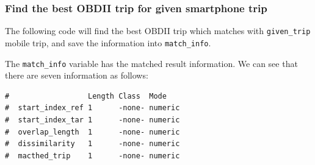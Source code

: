 \documentclass[letterpaper,9pt,twocolumn,twoside,]{pinp}
\begin{document}
\hypertarget{find-the-best-obdii-trip-for-given-smartphone-trip}{%
\subsubsection{Find the best OBDII trip for given smartphone
trip}\label{find-the-best-obdii-trip-for-given-smartphone-trip}}

The following code will find the best OBDII trip which matches with
\texttt{given\_trip} mobile trip, and save the information into
\texttt{match\_info}.

\begin{Shaded}
\begin{Highlighting}[]
\StringTok{ }\NormalTok{mobile_data[[}\NormalTok{]]}

\StringTok{ }
\end{Highlighting}
\end{Shaded}

The \texttt{match\_info} variable has the matched result information. We
can see that there are seven information as follows:

\begin{Shaded}
\begin{Highlighting}[]
\end{Highlighting}
\end{Shaded}

\begin{ShadedResult}
\begin{verbatim}
#                  Length Class  Mode   
#  start_index_ref 1      -none- numeric
#  start_index_tar 1      -none- numeric
#  overlap_length  1      -none- numeric
#  dissimilarity   1      -none- numeric
#  macthed_trip    1      -none- numeric
\end{verbatim}
\end{ShadedResult}

\begin{Shaded}
\begin{Highlighting}[]
\end{Highlighting}
\end{Shaded}
\end{document}
